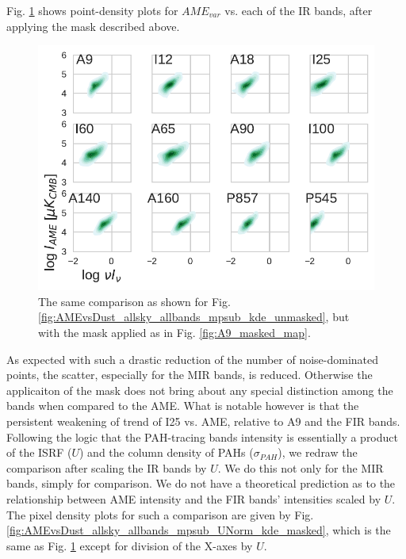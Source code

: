           Fig. \ref{fig:AMEvsDust_allsky_allbands_mpsub_kde_masked} shows point-density plots for $AME_{var}$ vs. each of the IR bands, after applying the mask described above.
            \begin{figure}
              \includegraphics[width=\textwidth]{../Plots/ch_allsky/AMEvsDust_allsky_allbands_mpsub_kde_masked.pdf}
              \centering
              \caption{The same comparison as shown for Fig. \ref{fig:AMEvsDust_allsky_allbands_mpsub_kde_unmasked}, but with the mask applied as in Fig. \ref{fig:A9_masked_map}.}
              \label{fig:AMEvsDust_allsky_allbands_mpsub_kde_masked}
            \end{figure}
          As expected with such a drastic reduction of the number of noise-dominated points, the scatter, especially for the MIR bands, is reduced. Otherwise the applicaiton of the mask does not bring about any special distinction among the bands when compared to the AME. What is notable however is that the persistent weakening of trend of I25 vs. AME, relative to A9 and the FIR bands. Following the logic that the PAH-tracing bands intensity is essentially a product of the ISRF ($U$) and the column density of PAHs ($\sigma_{PAH}$), we redraw the comparison after scaling the IR bands by $U$. We do this not only for the MIR bands, simply for comparison. We do not have a theoretical prediction as to the relationship between AME intensity and the FIR bands' intensities scaled by $U$. The pixel density plots for such a comparison are given by Fig. \ref{fig:AMEvsDust_allsky_allbands_mpsub_UNorm_kde_masked}, which is the same as Fig. \ref{fig:AMEvsDust_allsky_allbands_mpsub_kde_masked} except for division of the X-axes by $U$.
